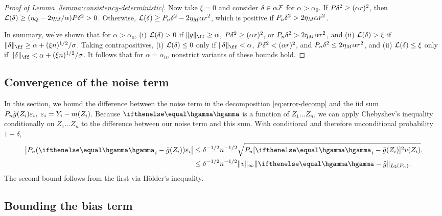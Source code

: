 \begin{proof}[Proof of Lemma~\ref{lemma:consistency-deterministic}]
Now take $\xi=0$ and consider $\delta \in \alpha\mathcal{F}$ for $\alpha > \alpha_0$.
If $\P \delta^2 \ge (\alpha r)^2$, then 
$\excess(\delta) \ge (\eta_Q - 2 \eta_M/\alpha) \P \delta^2 > 0$.
Otherwise, $\excess(\delta) \ge \Pn \delta^2 - 2 \eta_M \alpha r^2$,
which is positive if $\Pn \delta^2 > 2\eta_M \alpha r^2$.

In summary, we've shown that for $\alpha > \alpha_0$, (i) $\mathcal{L}(\delta) > 0$ if $\norm{g}_{\ff} \ge \alpha$, $\P \delta^2 \ge (\alpha r)^2$,
or $\Pn \delta^2 > 2\eta_M \alpha r^2$,  and (ii) $\mathcal{L}(\delta) > \xi$ if $\norm{\delta}_{\ff} \ge \alpha + (\xi n)^{1/2}/\sigma$. 
Taking contrapositives, (i)  $\mathcal{L}(\delta) \le 0$ only if 
$\norm{\delta}_{\ff} < \alpha$, $\P \delta^2 < (\alpha r)^2$, and $\Pn \delta^2 \le 2\eta_M \alpha r^2$,
and (ii) $\mathcal{L}(\delta) \le \xi$ only if $\norm{\delta}_{\ff} < \alpha + (\xi n)^{1/2}/\sigma$. 
It follows that for $\alpha=\alpha_0$, nonstrict variants of these bounds hold.
\end{proof}


\subsection{Convergence of the noise term} 
\label{sec:convergence-of-the-noise-term}

In this section, we bound the difference between the noise term in the decomposition \eqref{eq:error-decomp}
and the iid sum $\Pn \gapprox(Z_i) \varepsilon_i,\ \varepsilon_i = Y_i - m(Z_i)$. Because $\hriesz$ is a function of $Z_1 \ldots Z_n$,
we can apply Chebyshev's inequality conditionally on $Z_1 \ldots Z_n$ to the difference between our noise term and this sum. 
With conditional and therefore unconditional probability $1-\delta$,
\begin{equation}
\label{eq:noise-term-deviation}
\begin{aligned}
\abs*{ \Pn (\hriesz_i - \gapprox(Z_i)) \varepsilon_i } 
&\le \delta^{-1/2} n^{-1/2} \sqrt{\Pn [\hriesz_i - \gapprox(Z_i)]^2 v(Z_i)}.  \\
&\le \delta^{-1/2} n^{-1/2} \norm{v}_{\infty} \norm{\hriesz - \gapprox}_{L_2(\Pn)}.
\end{aligned}
\end{equation}
The second bound follows from the first via H\"older's inequality.

\subsection{Bounding the bias term}
\label{sec:bias-term-bound}

